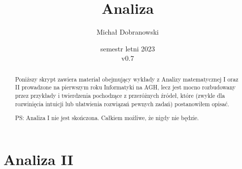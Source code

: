 \documentclass[11pt]{scrartcl}
\title{Analiza}
\author{Michał Dobranowski}
\date{semestr letni 2023\\ v0.7}
\begin{document}
    \maketitle
    \begin{abstract}
        Poniższy skrypt zawiera materiał obejmujący wykłady z Analizy matematycznej I oraz II prowadzone na pierwszym roku Informatyki na AGH, lecz jest mocno rozbudowany przez przykłady i twierdzenia pochodzące z przeróżnych źródeł, które (zwykle dla rozwinięcia intuicji lub ułatwienia rozwiązań pewnych zadań) postanowiłem opisać.

        PS: Analiza I nie jest skończona. Całkiem możliwe, że nigdy nie będzie.
    \end{abstract}
    \tableofcontents
    \eject






    \part{Analiza II}
\end{document}
